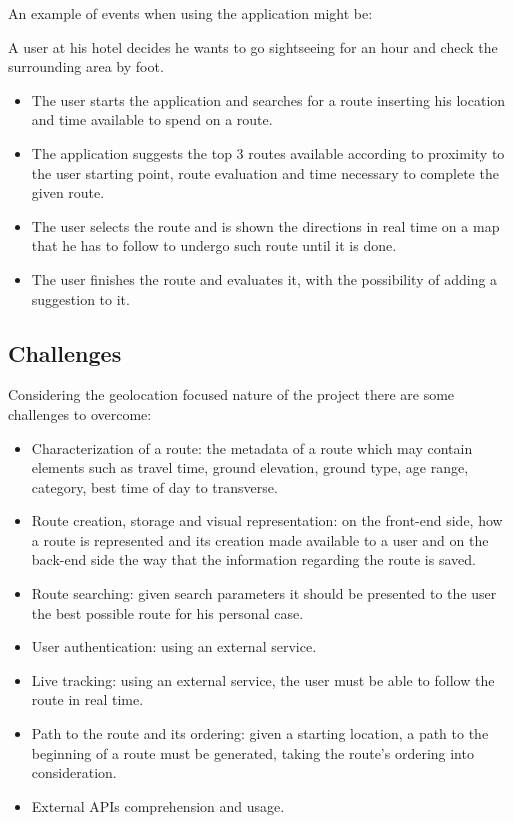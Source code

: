 \documentclass{article}
\begin{document}
            An example of events when using the application might be:

            A user at his hotel decides he wants to go sightseeing for an hour and check the surrounding area by foot.
        
        \begin{itemize}  
            \item The user starts the application and searches for a route inserting his location and time available to spend on a route.
            \item The application suggests the top 3 routes available according to proximity to the user starting point, route evaluation and time necessary to complete the given route. 
            \item The user selects the route and is shown the directions in real time on a map that he has to follow to undergo such route until it is done.
            \item The user finishes the route and evaluates it, with the possibility of adding a suggestion to it. 
        \end{itemize}
        
        \subsection{Challenges}
            
            Considering the geolocation focused nature of the project there are some challenges to overcome:

            \begin{itemize}
                \item Characterization of a route: the metadata of a route which may contain elements such as travel time, ground elevation, ground type, age range, category, best time of day to transverse.
                \item Route creation, storage and visual representation: on the front-end side, how a route is represented and its creation made available to a user and on the back-end side the way that the information regarding the route is saved.
                \item Route searching: given search parameters it should be presented to the user the best possible route for his personal case.  
                \item User authentication: using an external service.
                \item Live tracking: using an external service, the user must be able to follow the route in real time.
                \item Path to the route and its ordering: given a starting location, a path to the beginning of a route must be generated, taking the route's ordering into consideration.
                \item External APIs comprehension and usage.
            \end{itemize}
\end{document}
